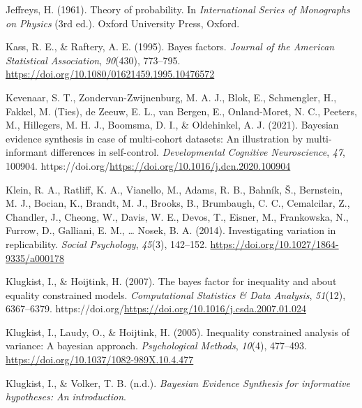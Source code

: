 \documentclass[
]{interact}
\newlength{\cslhangindent}
\newlength{\cslentryspacingunit} %
\newenvironment{CSLReferences}[2] %
    {%
  \setlength{\parindent}{0pt}
  \ifodd #1
  \let\oldpar\par
  \def\par{\hangindent=\cslhangindent\oldpar}
  \fi
  \setlength{\parskip}{#2\cslentryspacingunit}
 }%
 {}
\begin{document}
\begin{CSLReferences}{1}{0}
\leavevmode{}%
Jeffreys, H. (1961). {Theory of probability}. In \emph{{International
Series of Monographs on Physics}} (3rd ed.). Oxford University Press,
Oxford.

\leavevmode{}%
Kass, R. E., \& Raftery, A. E. (1995). Bayes factors. \emph{Journal of
the American Statistical Association}, \emph{90}(430), 773--795.
\url{https://doi.org/10.1080/01621459.1995.10476572}

\leavevmode{}%
Kevenaar, S. T., Zondervan-Zwijnenburg, M. A. J., Blok, E., Schmengler,
H., Fakkel, M. (Ties), de Zeeuw, E. L., van Bergen, E., Onland-Moret, N.
C., Peeters, M., Hillegers, M. H. J., Boomsma, D. I., \& Oldehinkel, A.
J. (2021). Bayesian evidence synthesis in case of multi-cohort datasets:
An illustration by multi-informant differences in self-control.
\emph{Developmental Cognitive Neuroscience}, \emph{47}, 100904.
https://doi.org/\url{https://doi.org/10.1016/j.dcn.2020.100904}

\leavevmode{}%
Klein, R. A., Ratliff, K. A., Vianello, M., Adams, R. B., Bahník, Š.,
Bernstein, M. J., Bocian, K., Brandt, M. J., Brooks, B., Brumbaugh, C.
C., Cemalcilar, Z., Chandler, J., Cheong, W., Davis, W. E., Devos, T.,
Eisner, M., Frankowska, N., Furrow, D., Galliani, E. M., \ldots{} Nosek,
B. A. (2014). Investigating variation in replicability. \emph{Social
Psychology}, \emph{45}(3), 142--152.
\url{https://doi.org/10.1027/1864-9335/a000178}

\leavevmode{}%
Klugkist, I., \& Hoijtink, H. (2007). The bayes factor for inequality
and about equality constrained models. \emph{Computational Statistics \&
Data Analysis}, \emph{51}(12), 6367--6379.
https://doi.org/\url{https://doi.org/10.1016/j.csda.2007.01.024}

\leavevmode{}%
Klugkist, I., Laudy, O., \& Hoijtink, H. (2005). Inequality constrained
analysis of variance: A bayesian approach. \emph{Psychological Methods},
\emph{10}(4), 477--493. \url{https://doi.org/10.1037/1082-989X.10.4.477}

\leavevmode{}%
Klugkist, I., \& Volker, T. B. (n.d.). \emph{{B}ayesian {E}vidence
{S}ynthesis for informative hypotheses: An introduction}.


\end{CSLReferences}
\end{document}
